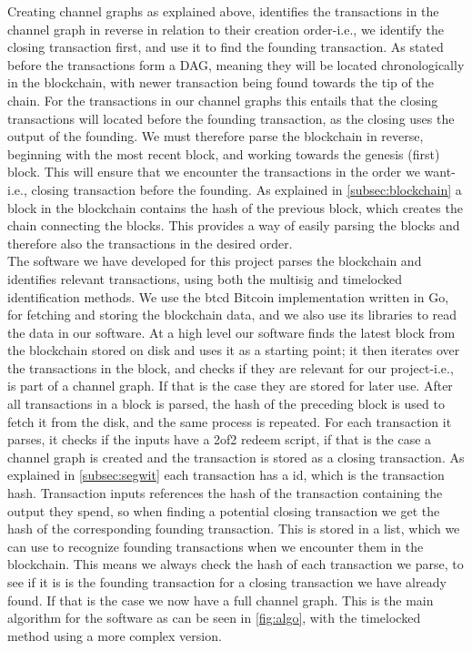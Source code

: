 Creating channel graphs as explained above, identifies the transactions in the channel graph in reverse in relation to their creation order-i.e., we identify the closing transaction first, and use it to find the founding transaction. As stated before the transactions form a DAG, meaning they will be located chronologically in the blockchain, with newer transaction being found towards the tip of the chain. For the transactions in our channel graphs this entails that the closing transactions will located before the founding transaction, as the closing uses the output of the founding.
We must therefore parse the blockchain in reverse, beginning with the most recent block, and working towards the genesis (first) block.
This will ensure that we encounter the transactions in the order we want-i.e., closing transaction before the founding.
As explained in \cref{subsec:blockchain} a block in the blockchain contains the hash of the previous block, which creates the chain connecting the blocks. This provides a way of easily parsing the blocks and therefore also the transactions in the desired order. 
\\

The software we have developed for this project parses the blockchain and identifies relevant transactions, using both the multisig and timelocked identification methods.
We use the btcd \cite{btcd_roasbeef} Bitcoin implementation written in Go, for fetching and storing the blockchain data, and we also use its libraries to read the data in our software.
At a high level our software finds the latest block from the blockchain stored on disk and uses it as a starting point;
it then iterates over the transactions in the block, and checks if they are relevant for our project-i.e., is part of a channel graph. If that is the case they are stored for later use. After all transactions in a block is parsed, the hash of the preceding block is used to fetch it from the disk, and the same process is repeated.
For each transaction it parses, it checks if the inputs have a 2of2 redeem script, if that is the case a channel graph is created and the transaction is stored as a closing transaction. As explained in \cref{subsec:segwit} each transaction has a id, which is the transaction hash. Transaction inputs references the hash of the transaction containing the output they spend, so when finding a potential closing transaction we get the hash of the corresponding founding transaction. This is stored in a list, which we can use to recognize founding transactions when we encounter them in the blockchain. This means we always check the hash of each transaction we parse, to see if it is is the founding transaction for a closing transaction we have already found. If that is the case we now have a full channel graph. This is the main algorithm for the software as can be seen in \cref{fig:algo}, with the timelocked method using a more complex version.

